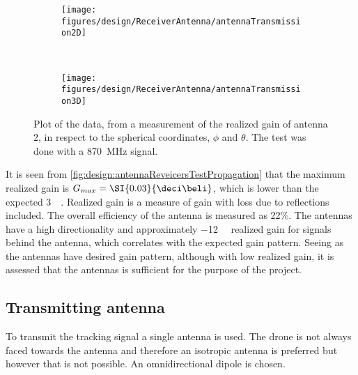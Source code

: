 \begin{figure}[h!]
    \centering
    \begin{subfigure}[b]{0.45\textwidth}
        \texttt{[image: figures/design/ReceiverAntenna/antennaTransmission2D]}
    \end{subfigure}
    ~ 
    \begin{subfigure}[b]{0.45\textwidth}
       \texttt{[image: figures/design/ReceiverAntenna/antennaTransmission3D]}
    \end{subfigure}
    \caption{Plot of the data, from a measurement of the realized gain of antenna 2, in respect to the spherical coordinates, $\phi$ and $\theta$. The test was done with a \SI{870}{\mega\hertz} signal.}\label{fig:design:antennaReveicersTestPropagation}
\end{figure}

It is seen from \autoref{fig:design:antennaReveicersTestPropagation} that the maximum realized gain is $G_{max} = \SI{0.03}{\deci\beli}$, which is lower than the expected \SI{3}{\deci\beli}. Realized gain is a measure of gain with loss due to reflections included. The overall efficiency of the antenna is measured as 22\%. 
%
%
%
The antennas have a high directionality and approximately \SI{-12}{\deci\beli} realized gain for signals behind the antenna, which correlates with the expected gain pattern. Seeing as the antennas have desired gain pattern, although with low realized gain, it is assessed that the antennas is sufficient for the purpose of the project.



\subsection{Transmitting antenna}
To transmit the tracking signal a single antenna is used. The drone is not always faced towards the antenna and therefore an isotropic antenna is preferred but however that is not possible. An omnidirectional dipole is chosen. 

